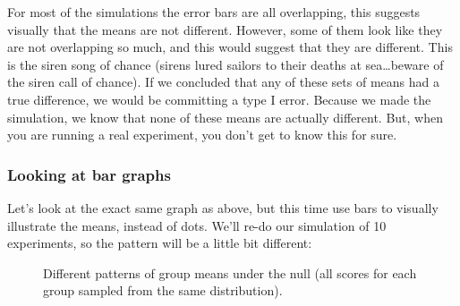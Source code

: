 \documentclass[
  letterpaper,
  DIV=11,
  numbers=noendperiod]{scrreprt}
\begin{document}
For most of the simulations the error bars are all overlapping, this
suggests visually that the means are not different. However, some of
them look like they are not overlapping so much, and this would suggest
that they are different. This is the siren song of chance (sirens lured
sailors to their deaths at sea\ldots beware of the siren call of
chance). If we concluded that any of these sets of means had a true
difference, we would be committing a type I error. Because we made the
simulation, we know that none of these means are actually different.
But, when you are running a real experiment, you don't get to know this
for sure.

\subsubsection{Looking at bar graphs}\label{looking-at-bar-graphs}

Let's look at the exact same graph as above, but this time use bars to
visually illustrate the means, instead of dots. We'll re-do our
simulation of 10 experiments, so the pattern will be a little bit
different:

\begin{figure}


\caption{\label{fig-8manyDiffsBar}Different patterns of group means
under the null (all scores for each group sampled from the same
distribution).}

\end{figure}%
\end{document}
